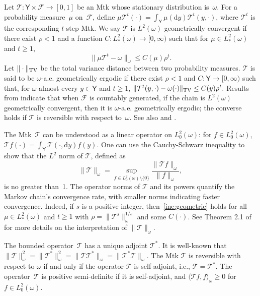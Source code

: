 \documentclass[12pt]{article}
\newcommand{\df}{\mathrm{d}}
\newcommand{\Y}{\mathsf{Y}}
\newcommand{\F}{\mathcal{F}}
\newcommand{\Mtk}{\mtkfont{T}}
\newcommand{\mtkfont}{\mathcal}
\begin{document}
Let $\Mtk: \Y \times \F \to [0,1]$ be an Mtk whose stationary distribution is~$\omega$.
For a probability measure~$\mu$ on~$\F$, define $\mu \Mtk^t(\cdot) = \int_{\Y} \mu(\df y) \Mtk^t(y, \cdot)$, where $\Mtk^t$ is the corresponding $t$-step Mtk.
We say $\Mtk$ is $L^2(\omega)$ geometrically convergent if there exist $\rho < 1$ and a function $C: L_*^2(\omega) \to [0,\infty)$ such that for $\mu \in L_*^2(\omega)$ and $t \geq 1$,
\begin{equation} \label{ine:geometric}
	\|\mu \Mtk^t - \omega\|_{\omega} \leq C(\mu) \rho^t.
\end{equation}
Let $\|\cdot\|_{\scriptsize\mbox{TV}}$ be the total variance distance between two probability measures.
$\Mtk$ is said to be $\omega$-a.e. geometrically ergodic if there exist $\rho < 1$ and $C: \Y \to [0, \infty)$ such that, for $\omega$-almost every $y \in \Y$ and $t \geq 1$,
$
	\|\Mtk^t(y,\cdot) - \omega(\cdot) \|_{\scriptsize\mbox{TV}} \leq C(y) \rho^t.
$
Results from \cite{roberts2001geometric} indicate that when $\F$ is countably generated, if the chain is $L^2(\omega)$ geometrically convergent, then it is $\omega$-a.e. geometrically ergodic; the converse holds if $\Mtk$ is reversible with respect to~$\omega$.
See also \cite{roberts1997geometric} and \cite{gallegos2023equivalences}.



The Mtk~$\Mtk$ can be understood as a linear operator on $L_0^2(\omega)$: for $f \in L_0^2(\omega)$, 
$
\Mtk f(\cdot) = \int_{\Y} \Mtk(\cdot, \df y) f(y).
$
One can use the Cauchy-Schwarz inequality to show that the $L^2$ norm of $\Mtk$, defined as
\[
\|\Mtk\|_{\omega} = \sup_{f \in L_0^2(\omega) \setminus \{0\}} \frac{\|\Mtk f\|_{\omega}}{\|f\|_{\omega}},
\]
is no greater than~1.
The operator norms of $\Mtk$ and its powers quantify the Markov chain's convergence rate, with smaller norms indicating faster convergence.
Indeed, if $s$ is a positive integer, then~\eqref{ine:geometric} holds for all $\mu \in L_*^2(\omega)$ and $t \geq 1$ with $\rho = \|\Mtk ^s\|_{\omega}^{1/s}$ and some $C(\cdot)$.
See Theorem 2.1 of \cite{roberts1997geometric} for more details on the interpretation of $\|\Mtk\|_{\omega}$.


The bounded operator~$\Mtk $ has a unique adjoint $\Mtk ^*$.
It is well-known that $\|\Mtk \|_{\omega}^2 = \|\Mtk ^*\|_{\omega}^2 = \|\Mtk  \Mtk ^*\|_{\omega} = \|\Mtk ^*\Mtk \|_{\omega}$.
The Mtk $\Mtk$ is reversible with respect to $\omega$ if and only if the operator $\Mtk$ is self-adjoint, i.e., $\Mtk  = \Mtk ^*$.
The operator~$\Mtk $ is positive semi-definite if it is self-adjoint, and $\langle \Mtk f, f \rangle_{\omega} \geq 0$ for $f \in L_0^2(\omega)$.
\end{document}
